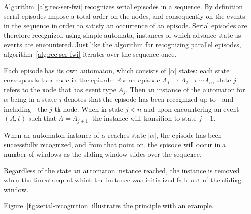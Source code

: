 \begin{algorithm}
\begin{algorithmic}[1]
\end{algorithmic}

\label{alg:rec-ser-fwi}
\end{algorithm}

Algorithm~\ref{alg:rec-ser-fwi} recognizes serial episodes in a sequence. By definition serial episodes impose a total order on the nodes, and consequently on the events in the sequence in order to satisfy an occurrence of an episode. Serial episodes are therefore recognized using simple automata, instances of which advance state as events are encountered. Just like the algorithm for recognizing parallel episodes, algorithm~\ref{alg:rec-ser-fwi} iterates over the sequence once.

Each episode has its own automaton, which consists of $ | \alpha | $ states: each state corresponds to a node in the episode. For an episode $ A_1 \to A_2 \to \cdots A_n $, state $ j $ refers to the node that has event type $ A_j $. Then an instance of the automaton for $ \alpha $ being in a state $ j $ denotes that the episode has been recognized up to---and including---the $ j $-th node. When in state $ j < n $ and upon encountering an event $ (A, t) $ such that $ A = A_{j + 1} $, the instance will transition to state $ j + 1 $.

When an automaton instance of $ \alpha $ reaches state $ | \alpha | $, the episode has been successfully recognized, and from that point on, the episode will occur in a number of windows as the sliding window slides over the sequence.

Regardless of the state an automaton instance reached, the instance is removed when the timestamp at which the instance was initialized falls out of the sliding window.

Figure~\ref{fig:serial-recognition} illustrates the principle with an example.

